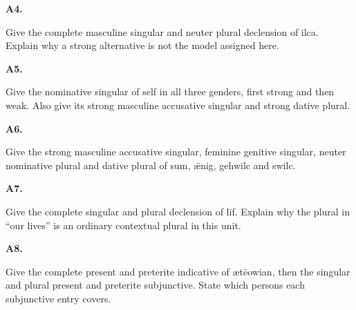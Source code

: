 \par\begin{minipage}{\linewidth}\raggedright
\textbf{A4.}

Give the complete masculine singular and neuter plural declension of ilca. Explain why a strong alternative is not the model assigned here.

\end{minipage}\par\addvspace{4pt}

\par\begin{minipage}{\linewidth}\raggedright
\textbf{A5.}

Give the nominative singular of self in all three genders, first strong and then weak. Also give its strong masculine accusative singular and strong dative plural.

\end{minipage}\par\addvspace{4pt}

\par\begin{minipage}{\linewidth}\raggedright
\textbf{A6.}

Give the strong masculine accusative singular, feminine genitive singular, neuter nominative plural and dative plural of sum, ǣnig, gehwilc and swilc.

\end{minipage}\par\addvspace{4pt}

\par\begin{minipage}{\linewidth}\raggedright
\textbf{A7.}

Give the complete singular and plural declension of līf. Explain why the plural in “our lives” is an ordinary contextual plural in this unit.

\end{minipage}\par\addvspace{4pt}

\par\begin{minipage}{\linewidth}\raggedright
\textbf{A8.}

Give the complete present and preterite indicative of ætēowian, then the singular and plural present and preterite subjunctive. State which persons each subjunctive entry covers.

\end{minipage}\par\addvspace{4pt}

